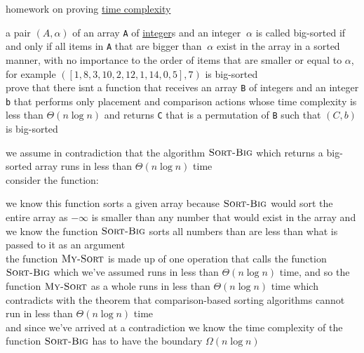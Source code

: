 \documentclass[a4paper,12pt]{article}
\begin{document}
\newenvironment{note}
  {\begin{bclogo}[logo=\bcinfo, couleurBarre=orange, couleur=lightgray]{ note}}
  {\end{bclogo}}
\newenvironment{attention}
  {\begin{bclogo}[logo=\bcattention, couleurBarre=red, noborder=true, 
                couleur=red!15]{Important!}}
  {\end{bclogo}}

homework on proving \href{20221130014441-time_complexity.org}{time complexity}\\[0pt]

\begin{question}
a pair \((A,\alpha)\) of an array \texttt{A} of \href{calculus2.org}{integer}s and an integer \(~\alpha\) is called big-sorted if and only if all items in \texttt{A} that are bigger than \(~\alpha\) exist in the array in a sorted manner, with no importance to the order of items that are smaller or equal to \(\alpha\), for example \(([1,8,3,10,2,12,1,14,0,5],7)\) is big-sorted\\[0pt]
prove that there isnt a function that receives an array \texttt{B} of integers and an integer \texttt{b} that performs only placement and comparison actions whose time complexity is less than \(\Theta(n\log n)\) and returns \texttt{C} that is a permutation of \texttt{B} such that \((C,b)\) is big-sorted\\[0pt]
\begin{answer}
we assume in contradiction that the algorithm \(\textsc{Sort-Big}\) which returns a big-sorted array runs in less than \(\Theta(n\log n)\) time\\[0pt]
consider the function:\\[0pt]
\begin{center}

\end{center}

we know this function sorts a given array because \(\textsc{Sort-Big}\) would sort the entire array as \(-\infty\) is smaller than any number that would exist in the array and we know the function \(\textsc{Sort-Big}\) sorts all numbers than are less than what is passed to it as an argument\\[0pt]
the function \(\textsc{My-Sort}\) is made up of one operation that calls the function \(\textsc{Sort-Big}\) which we've assumed runs in less than \(\Theta(n\log n)\) time, and so the function \(\textsc{My-Sort}\) as a whole runs in less than \(\Theta(n\log n)\) time which contradicts with the theorem that comparison-based sorting algorithms cannot run in less than \(\Theta(n\log n)\) time\\[0pt]
and since we've arrived at a contradiction we know the time complexity of the function \(\textsc{Sort-Big}\) has to have the boundary \(\Omega(n\log n)\)\\[0pt]
\end{answer}
\end{question}
\end{document}
